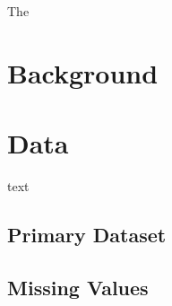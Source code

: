 \documentclass[11pt, a4paper]{article}
\begin{document}
\setcounter{page}{1}

\normalsize
The

















\pagebreak 
\section{Background}






















\pagebreak 
\section{Data}


text




\subsection{Primary Dataset}


















\subsection{Missing Values}
\end{document}
